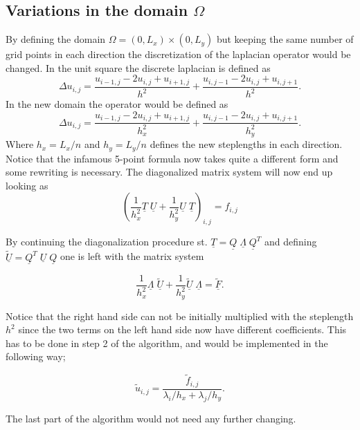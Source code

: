 \subsection{Variations in the domain $\Omega$}
By defining the domain $\Omega = (0,L_x)\times(0,L_y)$ but keeping the same number of grid points in each direction 
the discretization of the laplacian operator would be changed. In the unit square the discrete laplacian is defined as 
\begin{equation}
	\Delta u_{i,j} = \frac{u_{i-1,j}-2u_{i,j}+u_{i+1,j}}{h^2}+\frac{u_{i,j-1}-2u_{i,j}+u_{i,j+1}}{h^2}.
\end{equation}
In the new domain the operator would be defined as  
\begin{equation}
	\Delta u_{i,j} = \frac{u_{i-1,j}-2u_{i,j}+u_{i+1,j}}{h_x^2}+\frac{u_{i,j-1}-2u_{i,j}+u_{i,j+1}}{h_y^2}.
\end{equation}
Where $h_x=L_x/n$ and $h_y=L_y/n$ defines the new steplengths in each direction. Notice that the infamous 5-point formula now takes quite a 
different form and some rewriting is necessary. 
The diagonalized matrix system will now end up looking as 
\begin{equation}
	\left( \frac{1}{h_x^2}\underline{T} \; \underline{U}+\frac{1}{h_y^2}\underline{U}\; \underline{T} \right) _{i,j}=f_{i,j}
\end{equation}

By continuing the diagonalization procedure st. $\underline{T}=\underline{Q}\;\underline{\Lambda}\;\underline{Q}^T $
and defining $\underline{\tilde{U}}= \underline{Q}^T\;\underline{U}\;\underline{Q}$ one is left with the matrix system 

\begin{equation}
	\frac{1}{h_x^2}\underline{\Lambda} \; \underline{\tilde{U}}+\frac{1}{h_y^2}\underline{\tilde{U}}\; \underline{\Lambda} =\underline{\tilde{F}}.
\end{equation}

Notice that the right hand side can not be initially multiplied with the steplength $h^2$ since the two terms on the left hand side
now have different coefficients. This has to be done in step 2 of the algorithm, and would be implemented in the following way; 

\begin{equation}
	\tilde{u}_{i,j} = \frac{\tilde{f}_{i,j}}{\lambda_i/h_x+\lambda_j/h_y}.
\end{equation}

The last part of the algorithm would not need any further changing.

